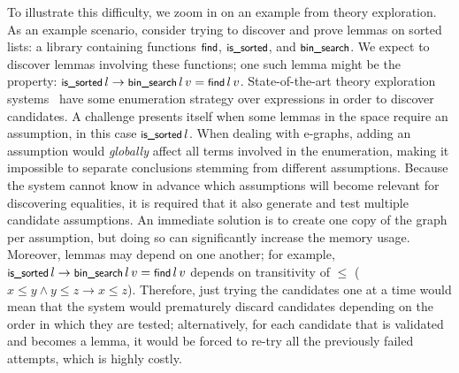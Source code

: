 To illustrate this difficulty, we zoom in on an example from theory exploration.
As an example scenario, consider trying to discover and prove lemmas on sorted lists:
a library containing functions $\tlfind$, $\tissorted$, and $\tbinsearch$.
We expect to discover lemmas involving these functions; one such lemma might be the property: $\tissorted\,l \rightarrow \tbinsearch\, l\,v = \tlfind\,l\,v$.
State-of-the-art theory exploration systems~\cite{ITP2017:Johansson,ruler,thesy} have some enumeration strategy over expressions in order to discover candidates. 
A challenge presents itself when some lemmas in the space require an assumption, in this case $\tissorted\,l$.
When dealing with e-graphs,
adding an assumption would \emph{globally}
affect all terms involved in the enumeration, making it impossible to separate conclusions stemming from different assumptions.
Because the system cannot know in advance which assumptions will become relevant for discovering equalities, it is required that it also generate and test multiple candidate assumptions.
An immediate solution is to create one copy of the graph per assumption, but doing so can significantly increase the memory usage.
Moreover, lemmas may depend on one another; for example, $\tissorted\,l \rightarrow \tbinsearch\, l\,v = \tlfind\,l\,v$ depends on transitivity of $\leq$ ($x\leq y \land y\leq z \rightarrow x\leq z$).
Therefore, just trying the candidates one at a time would mean that the system would prematurely discard candidates depending on the order in which they are tested; alternatively, for each candidate that is validated and becomes a lemma, it would be forced to re-try all the previously failed attempts, which is highly costly.


